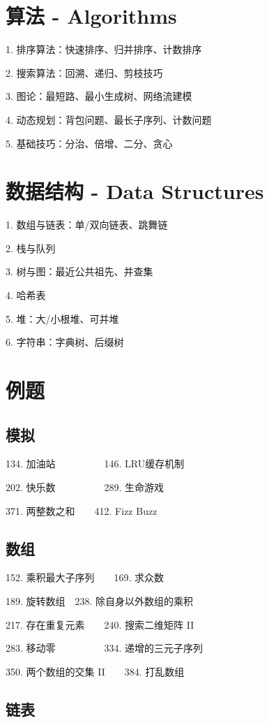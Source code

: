 \documentclass[twocolumn, a4paper, 11pt]{article}
\begin{document}
	\section{算法 - Algorithms}
	
	1. 排序算法：快速排序、归并排序、计数排序
	
	2. 搜索算法：回溯、递归、剪枝技巧
	
	3. 图论：最短路、最小生成树、网络流建模
	
	4. 动态规划：背包问题、最长子序列、计数问题
	
	5. 基础技巧：分治、倍增、二分、贪心

	\section{数据结构 - Data Structures}
	
	1. 数组与链表：单/双向链表、跳舞链
	
	2. 栈与队列
	
	3. 树与图：最近公共祖先、并查集
	
	4. 哈希表
	
	5. 堆：大/小根堆、可并堆
	
	6. 字符串：字典树、后缀树

	\section{例题}
	
	\subsection{模拟}
	
	134. 加油站~~~~~~~~~~146. LRU缓存机制
	
	202. 快乐数~~~~~~~~~~289. 生命游戏
	
	371. 两整数之和~~~~412. Fizz Buzz
	
	\subsection{数组}
	
	152. 乘积最大子序列~~~~169. 求众数
	
	189. 旋转数组~~238. 除自身以外数组的乘积
	
	217. 存在重复元素~~~~240. 搜索二维矩阵 II
	
	283. 移动零~~~~~~~~~~334. 递增的三元子序列
	
	350. 两个数组的交集 II~~~~384. 打乱数组
	
	\subsection{链表}
	
\end{document}
